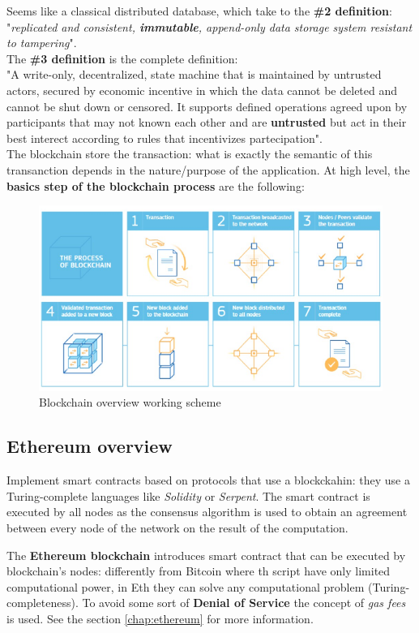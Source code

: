 \documentclass[10pt,a4paper]{report}
\begin{document}
Seems like a classical distributed database, which take to the \textbf{\#2 definition}:
"\textit{replicated and consistent, \textbf{immutable}, append-only data storage system resistant to tampering}".\\
The \textbf{\#3 definition} is the complete definition:\\
"A write-only, decentralized, state machine that is maintained by untrusted
actors, secured by economic incentive in which the data cannot be deleted and cannot be shut down or censored. It supports defined operations agreed upon by participants that may not known each other and are \textbf{untrusted} but act in their best interect according to rules that incentivizes partecipation".
\\
The blockchain store the transaction: what is exactly the semantic of this transanction depends in the nature/purpose of the application. At high level, the \textbf{basics step of the blockchain process} are the following:
\begin{figure}[b!]
	\centering
	\includegraphics[scale=0.60] {images/Pasted image 20230224141628.png}
	\caption{Blockchain overview working scheme}
\end{figure}

\subsection{Ethereum overview}\label{sec:ethereum-overview}
Implement smart contracts based on protocols that use a blockckahin: they use a Turing-complete languages like  \textit{Solidity} or \textit{Serpent}. The smart contract is executed by all nodes as the consensus algorithm is used to obtain an agreement between every node of the network on the result of the computation.

The \textbf{Ethereum blockchain} introduces smart contract that can be executed by blockchain's nodes: differently from Bitcoin where th script have only limited computational power, in Eth they can solve any computational problem (Turing-completeness). To avoid some sort of \textbf{Denial of Service} the concept of \textit{gas fees} is used. See the section \ref{chap:ethereum} for more information.\\
\end{document}
